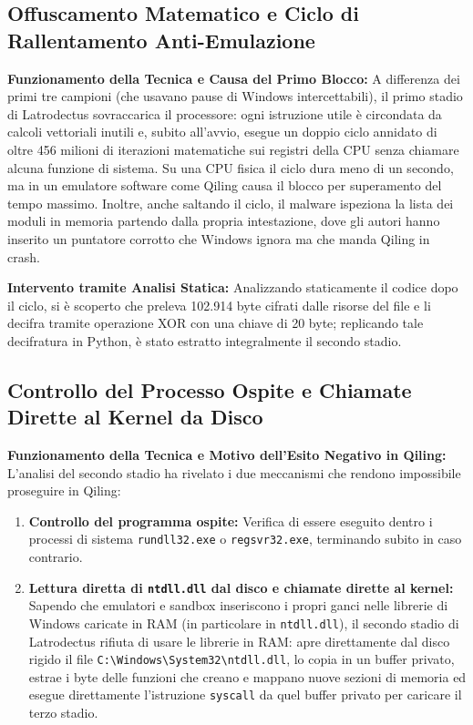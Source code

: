 \documentclass[11pt, a4paper]{article}
\begin{document}
	\subsection{Offuscamento Matematico e Ciclo di Rallentamento Anti-Emulazione}
	
	\textbf{Funzionamento della Tecnica e Causa del Primo Blocco:} A differenza dei primi tre campioni (che usavano pause di Windows intercettabili), il primo stadio di Latrodectus sovraccarica il processore: ogni istruzione utile è circondata da calcoli vettoriali inutili e, subito all'avvio, esegue un doppio ciclo annidato di oltre 456 milioni di iterazioni matematiche sui registri della CPU senza chiamare alcuna funzione di sistema. Su una CPU fisica il ciclo dura meno di un secondo, ma in un emulatore software come Qiling causa il blocco per superamento del tempo massimo. Inoltre, anche saltando il ciclo, il malware ispeziona la lista dei moduli in memoria partendo dalla propria intestazione, dove gli autori hanno inserito un puntatore corrotto che Windows ignora ma che manda Qiling in crash.
	
	\textbf{Intervento tramite Analisi Statica:} Analizzando staticamente il codice dopo il ciclo, si è scoperto che preleva 102.914 byte cifrati dalle risorse del file e li decifra tramite operazione XOR con una chiave di 20 byte; replicando tale decifratura in Python, è stato estratto integralmente il secondo stadio.
	
	\subsection{Controllo del Processo Ospite e Chiamate Dirette al Kernel da Disco}
	
	\textbf{Funzionamento della Tecnica e Motivo dell'Esito Negativo in Qiling:} L'analisi del secondo stadio ha rivelato i due meccanismi che rendono impossibile proseguire in Qiling:
	
	\begin{enumerate}
		\item \textbf{Controllo del programma ospite:} Verifica di essere eseguito dentro i processi di sistema \texttt{rundll32.exe} o \texttt{regsvr32.exe}, terminando subito in caso contrario.
		\item \textbf{Lettura diretta di \texttt{ntdll.dll} dal disco e chiamate dirette al kernel:} Sapendo che emulatori e sandbox inseriscono i propri ganci nelle librerie di Windows caricate in RAM (in particolare in \texttt{ntdll.dll}), il secondo stadio di Latrodectus rifiuta di usare le librerie in RAM: apre direttamente dal disco rigido il file \texttt{C:\textbackslash Windows\textbackslash System32\textbackslash ntdll.dll}, lo copia in un buffer privato, estrae i byte delle funzioni che creano e mappano nuove sezioni di memoria ed esegue direttamente l'istruzione \texttt{syscall} da quel buffer privato per caricare il terzo stadio.
	\end{enumerate}
	
\end{document}
